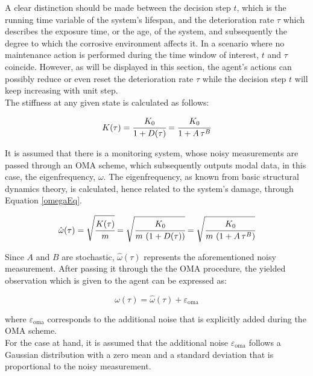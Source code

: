 A clear distinction should be made between the decision step $t$, which is the running time variable of the system's lifespan, and the deterioration rate $\tau$ which describes the exposure time, or the age, of the system, and subsequently the degree to which the corrosive environment affects it. In a scenario where no maintenance action is performed during the time window of interest, $t$ and $\tau$ coincide. However, as will be displayed in this section, the agent's actions can possibly reduce or even reset the deterioration rate $\tau$ while the decision step $t$ will keep increasing with unit step.\\

The stiffness at any given state is calculated as follows:

\begin{equation}
    K(\tau) = \cfrac{K_0}{1+D(\tau)} = \cfrac{K_0}{1+A\,\tau^B}
\end{equation}

It is assumed that there is a monitoring system, whose noisy measurements are passed through an \gls{OMA} scheme, which subsequently outputs modal data, in this case, the eigenfrequency, $\omega$. The eigenfrequency, as known from basic structural dynamics theory, is calculated, hence related to the system's damage, through Equation \ref{omegaEq}. 

\begin{equation}
    \hat{\omega} (\tau) = \sqrt{\cfrac{K(\tau)}{m}} = \sqrt{\cfrac{K_0}{m \, \left ( 1 + D(\tau) \right )}} = \sqrt{\cfrac{K_0}{m \, \left ( 1 + A \, \tau^B \right )}} \label{omegaEq}
\end{equation}

Since $A$ and $B$ are stochastic, $\hat{\omega}(\tau)$ represents the aforementioned noisy measurement. After passing it through the the \gls{OMA} procedure, the yielded observation which is given to the agent can be expressed as:

\begin{equation}
    \omega (\tau ) = \hat{\omega}(\tau ) + \varepsilon_{\text{oma}} \label{noisyObs}
\end{equation}

where $\varepsilon _{\text{oma}}$ corresponds to the additional noise that is explicitly added during the \gls{OMA} scheme.\\

For the case at hand, it is assumed that the additional noise $\varepsilon _{\text{oma}}$ follows a Gaussian distribution with a zero mean and a standard deviation that is proportional to the noisy measurement. 

